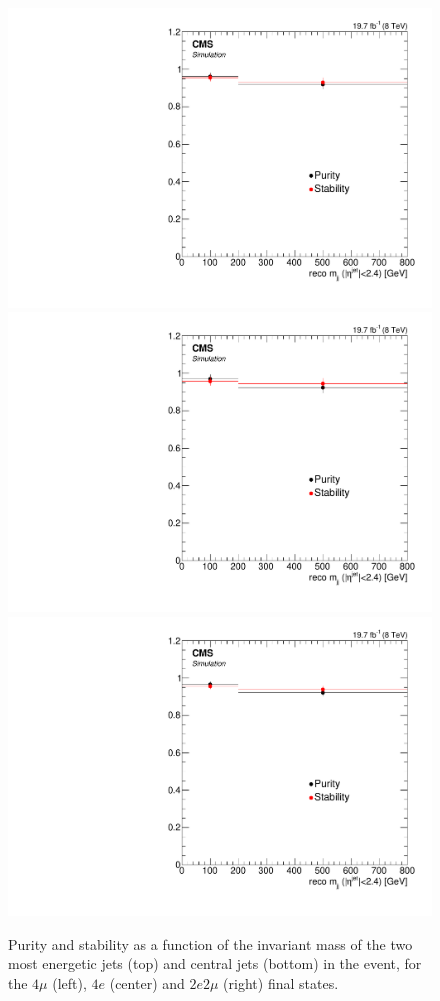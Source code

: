 \begin{figure}[hbtp]
\begin{center}
    \includegraphics[width=0.8\cmsFigWidth]{Figures/Unfolding/BinMigration/PurityStability_4m_CentralMjj_Mad}
    \includegraphics[width=0.8\cmsFigWidth]{Figures/Unfolding/BinMigration/PurityStability_4e_CentralMjj_Mad}
    \includegraphics[width=0.8\cmsFigWidth]{Figures/Unfolding/BinMigration/PurityStability_2e2m_CentralMjj_Mad}
 \caption{Purity and stability as a function of the invariant mass of the two most energetic jets (top) and  central jets (bottom) in the event,  for the $4\mu$ (left), $4e$ (center) and $2e2\mu$ (right) final states.}
    \label{fig:ps_mjj}
  \end{center}
\end{figure}
